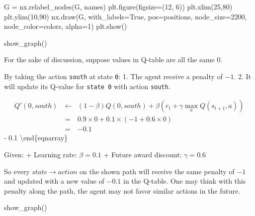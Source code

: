 \documentclass[
  letterpaper,
]{scrbook}
\newenvironment{Shaded}{\begin{snugshade}}{\end{snugshade}}
\newcommand{\DecValTok}[1]{\textcolor[rgb]{0.68,0.00,0.00}{#1}}
\newcommand{\NormalTok}[1]{\textcolor[rgb]{0.00,0.23,0.31}{#1}}
\newcommand{\OperatorTok}[1]{\textcolor[rgb]{0.37,0.37,0.37}{#1}}
\newcommand{\VariableTok}[1]{\textcolor[rgb]{0.07,0.07,0.07}{#1}}
\begin{document}
\begin{Shaded}
\begin{Highlighting}[]
\NormalTok{    G }\OperatorTok{=}\NormalTok{ nx.relabel\_nodes(G, names)}
\NormalTok{    plt.figure(figsize}\OperatorTok{=}\NormalTok{(}\DecValTok{12}\NormalTok{, }\DecValTok{6}\NormalTok{))}
\NormalTok{    plt.xlim(}\DecValTok{25}\NormalTok{,}\DecValTok{80}\NormalTok{)}
\NormalTok{    plt.ylim(}\DecValTok{10}\NormalTok{,}\DecValTok{90}\NormalTok{)}
\NormalTok{    nx.draw(G, with\_labels}\OperatorTok{=}\VariableTok{True}\NormalTok{, pos}\OperatorTok{=}\NormalTok{positions, node\_size}\OperatorTok{=}\DecValTok{2200}\NormalTok{, node\_color}\OperatorTok{=}\NormalTok{colors, alpha}\OperatorTok{=}\DecValTok{1}\NormalTok{)}
\NormalTok{    plt.show()}
\end{Highlighting}
\end{Shaded}

\begin{Shaded}
\begin{Highlighting}[]
\NormalTok{show\_graph()}
\end{Highlighting}
\end{Shaded}

For the sake of discussion, suppose values in Q-table are all the same
\(0\).

By taking the action \texttt{south} at state \texttt{0}: 1. The agent
receive a penalty of \(-1\). 2. It will update its Q-value for
\texttt{state\ 0} with action \texttt{south}.

\begin{eqnarray}
Q'(0, south) \
& \leftarrow & (1-\beta) Q(0, south) + \beta (r_t + \gamma \max_a{Q(s_{t+1},a)}) \\
         & = & 0.9 \times 0 + 0.1\times(-1 + 0.6\times 0)\\
         & = & - 0.1
\end{eqnarray} - 0.1 \textbackslash end\{eqnarray\}

Given: + Learning rate: \(\beta = 0.1\) + Future award discount:
\(\gamma = 0.6\)

So every \(state \to action\) on the shown path will receive the same
penalty of \(-1\) and updated with a new value of \(-0.1\) in the
Q-table. One may think with this penalty along the path, the agent may
not favor similar actions in the future.

\begin{Shaded}
\begin{Highlighting}[]
\NormalTok{show\_graph()}
\end{Highlighting}
\end{Shaded}
\end{document}
